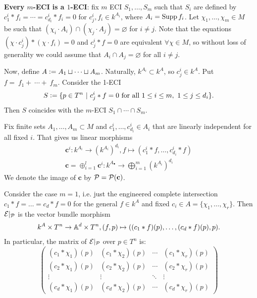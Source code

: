 \begin{remark}\label{rem:prelim_engin_m_ECI_is_ECI}
    \textbf{Every $m$-ECI is a $1$-ECI}: fix $m$ ECI $S_1, \dots, S_m$ such that $S_i$ are defined by $c^i_1 * f_i = \cdots = c^i_{d_i} * f_i = 0$ for $c^i_j, f_i \in k^{A_i}$, where $A_i = \Supp f_i$. Let $\chi_1, \dots, \chi_m \in M$ be such that $(\chi_i \cdot A_i) \cap (\chi_j \cdot A_j) = \varnothing$ for $i \ne j$. Note that the equations $(\chi \cdot c^i_j) * (\chi \cdot f_i) = 0$ and $c^i_j * f = 0$ are equivalent $\forall \chi \in M$, so without loss of generality we could assume that $A_i \cap A_j = \varnothing$ for all $i \ne j$.
    
    Now, define $A \defeq A_1 \sqcup \cdots \sqcup A_m$. Naturally, $k^{A_i} \subset k^A$, so $c^i_j \in k^A$. Put $f = ~f_1 + ~\cdots + ~f_m$. Consider the 1-ECI 
    \[
    S \defeq \{ p \in T^n\ |\ c^i_j * f = 0 \text{ for all } 1 \le i \le m,\ 1 \le j \le d_i \}.
    \]
    Then $S$ coincides with the $m$-ECI $S_1 \cap \cdots \cap S_m$.
\end{remark}

\begin{notation}
    Fix finite sets $A_1, \dots, A_m \subset M$ and $c^i_1, \dots, c^i_{d_i} \in A_i$ that are linearly independent for all fixed $i$. That gives us linear morphisms
    \begin{gather*}
        \mathbf c^i : k^{A_i} \to \left( k^{A_i} \right)^{d_i}, f \mapsto (c^i_1 * f, \dots, c^i_{d_i} * f) \\
        \mathbf c = \oplus_{i = 1}^l \mathbf c^i: k^{A_\bullet} \to \bigoplus_{i = 1}^m (k^{A_i})^{d_i}    
    \end{gather*}
    We denote the image of $\mathbf c$ by $\P = \P(\mathbf c)$. 
\end{notation}

\begin{remark}
    Consider the case $m = 1$, i.e. just the engineered complete intersection $c_1 * f = \dots = c_d * f = 0$ for the general $f \in k^A$ and fixed $c_i \in A = \{ \chi_1, \dots, \chi_r \}$. Then $\mathcal E|_\P$ is the vector bundle morphism 
    \[
    k^A \times T^n \to \A^d \times T^n, (f, p) \mapsto ((c_1 * f)(p), \dots, (c_d * f)(p), p).
    \]
    In particular, the matrix of $\mathcal E|_\P$ over $p \in T^n$ is:
    \[
    \begin{pmatrix}
        (c_1 * \chi_1) (p) & (c_1 * \chi_2) (p) & \cdots & (c_1 * \chi_r) (p) \\
        (c_2 * \chi_1) (p) & (c_2 * \chi_2) (p) & \cdots & (c_2 * \chi_r) (p) \\
        \vdots & \vdots & \ddots & \vdots \\
        (c_d * \chi_1) (p) & (c_d * \chi_2) (p) & \cdots & (c_d * \chi_r) (p)
    \end{pmatrix}
    \]
\end{remark}

